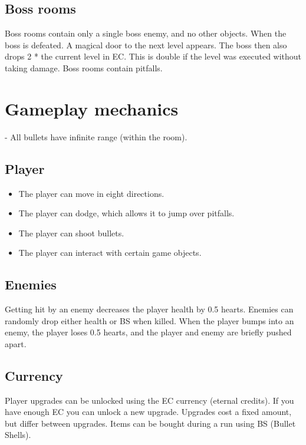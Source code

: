 \documentclass{article}
\begin{document}
\subsection{Boss rooms}
Boss rooms contain only a single boss enemy, and no other objects. 
When the boss is defeated. A magical door to the next level appears.
The boss then also drops 2 * the current level in EC. This is double if the level was executed without taking damage.
Boss rooms contain pitfalls.

\section{Gameplay mechanics}
- All bullets have infinite range (within the room).

\subsection{Player}
\begin{itemize}
    \item The player can move in eight directions.
    \item The player can dodge, which allows it to jump over pitfalls.
    \item The player can shoot bullets.
    \item The player can interact with certain game objects.
\end{itemize}

\subsection{Enemies}
Getting hit by an enemy decreases the player health by 0.5 hearts.
Enemies can randomly drop either health or BS when killed.
When the player bumps into an enemy, the player loses 0.5 hearts, and the player and enemy are briefly pushed apart.

\subsection{Currency}
Player upgrades can be unlocked using the EC currency (eternal credits). If you have enough EC you can unlock a new upgrade.
Upgrades cost a fixed amount, but differ between upgrades.
Items can be bought during a run using BS (Bullet Shells).
\end{document}
